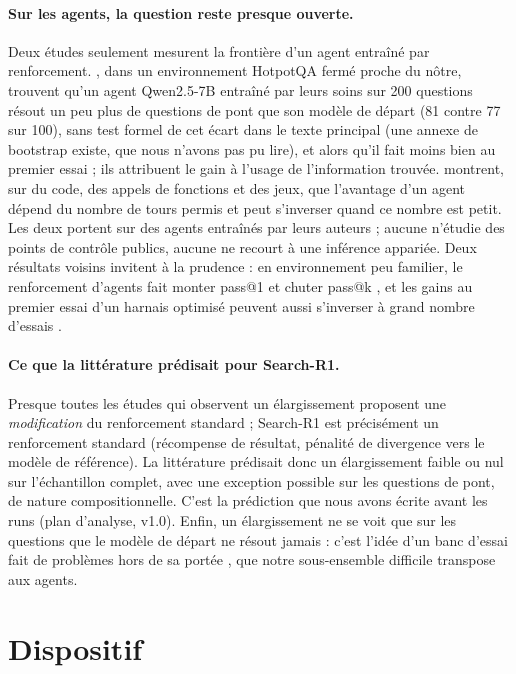 \documentclass[11pt,a4paper]{article}
\begin{document}
\paragraph{Sur les agents, la question reste presque ouverte.} Deux études seulement mesurent la frontière d'un agent entraîné par renforcement. \citet{zhai2026does}, dans un environnement HotpotQA fermé proche du nôtre, trouvent qu'un agent Qwen2.5-7B entraîné par leurs soins sur 200 questions résout un peu plus de questions de pont que son modèle de départ (81 contre 77 sur 100), sans test formel de cet écart dans le texte principal (une annexe de bootstrap existe, que nous n'avons pas pu lire), et alors qu'il fait moins bien au premier essai ; ils attribuent le gain à l'usage de l'information trouvée. \citet{zhu2026what} montrent, sur du code, des appels de fonctions et des jeux, que l'avantage d'un agent dépend du nombre de tours permis et peut s'inverser quand ce nombre est petit. Les deux portent sur des agents entraînés par leurs auteurs ; aucune n'étudie des points de contrôle publics, aucune ne recourt à une inférence appariée. Deux résultats voisins invitent à la prudence : en environnement peu familier, le renforcement d'agents fait monter pass@1 et chuter pass@k \citep{chen2026explore}, et les gains au premier essai d'un harnais optimisé peuvent aussi s'inverser à grand nombre d'essais \citep{kim2026elicitation}.

\paragraph{Ce que la littérature prédisait pour Search-R1.} Presque toutes les études qui observent un élargissement proposent une \emph{modification} du renforcement standard ; Search-R1 \citep{jin2025search} est précisément un renforcement standard (récompense de résultat, pénalité de divergence vers le modèle de référence). La littérature prédisait donc un élargissement faible ou nul sur l'échantillon complet, avec une exception possible sur les questions de pont, de nature compositionnelle. C'est la prédiction que nous avons écrite avant les runs (plan d'analyse, v1.0). Enfin, un élargissement ne se voit que sur les questions que le modèle de départ ne résout jamais : c'est l'idée d'un banc d'essai fait de problèmes hors de sa portée \citep{mayilvahanan2025mathbeyond}, que notre sous-ensemble difficile transpose aux agents.

\section{Dispositif}
\end{document}
